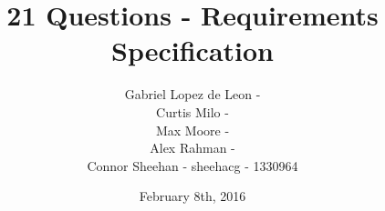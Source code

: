 \documentclass[12pt]{article}
\begin{document}
\title{21 Questions - Requirements Specification}
\author{Gabriel Lopez de Leon - \\Curtis Milo - \\Max Moore - \\Alex Rahman - \\Connor Sheehan - sheehacg - 1330964}
\date{February 8th, 2016}
\maketitle

\end{document}
